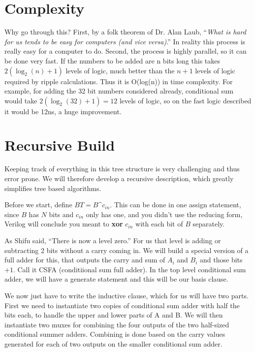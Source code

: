 \section{Complexity}

Why go through this?  First, by a folk theorem of Dr. Alan Laub, ``\emph{What is hard for us tends to be easy for computers (and vice versa)}.''  In reality this process is really easy for a computer to do.  Second, the process is highly parallel, so it can be done very fast.  If the numbers to be added are n bits long this takes $2(\log_2(n)+1)$ levels of logic, much better than the $n+1$ levels of logic required by ripple calculations.  Thus it is O(log(n)) in time complexity.  For example, for adding the 32 bit numbers considered already, conditional sum would take $2(\log_2(32)+1)=12$ levels of logic, so on the fast logic described it would be 12ns, a huge improvement.



\section{Recursive Build}

Keeping track of everything in this tree structure is very challenging and thus error prone. We will therefore develop a recursive description, which greatly simplifies tree based algorithms. 

Before we start, define $BT = B \mbox{\textasciicircum} c_{in}$. This can be done in one assign statement, since $B$ has $N$ bits and $c_{in}$ only has one, and you didn't use the reducing form, Verilog will conclude you meant to \textbf{xor} $c_{in}$ with each bit of $B$ separately.

As Shifu said, ``There is now a level zero.'' For us that level is adding or subtracting 2 bits without a
carry coming in. We will build a special version of a full adder for this, that outputs the carry and sum of
$A_i$ and $B_i$ and those bits $+1$. Call it CSFA (conditiional sum full adder). In the top level conditional sum
adder, we will have a generate statement and this will be our basis clause.

We now just have to write the inductive clause, which for us will have two parts. First we need to
instantiate two copies of conditional sum adder with half the bits each, to handle the upper and lower
parts of A and B. We will then instantiate two muxes for combining the four outputs of the two half-sized
conditional summer adders. Combining is done based on the carry values generated for each of two outputs
on the smaller conditional sum adder.

